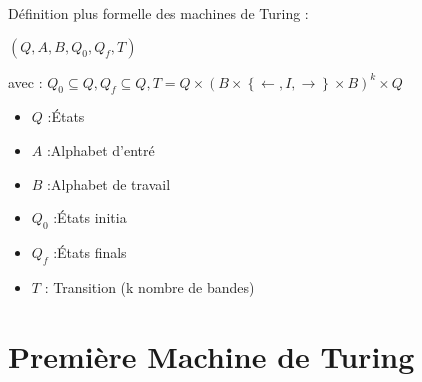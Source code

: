 \documentclass{article}
\theoremstyle{plain}
\theoremstyle{nonumberplain}
\begin{document}
  Définition plus formelle des machines de Turing :

  $(Q, A, B, Q_0, Q_f, T)$

  avec : $Q_0 \subseteq Q, Q_f \subseteq Q, T = Q \times (B \times \left\{\leftarrow, I, \rightarrow\right\} \times B)^k \times Q$

  \begin{itemize}
    \item $Q$ :\'Etats
    \item $A$ :Alphabet d'entré
    \item $B$ :Alphabet de travail
    \item $Q_0$ :\'Etats initia
    \item $Q_f$ :\'Etats finals
    \item $T$ : Transition (k nombre de bandes)
  \end{itemize}

\newpage
\section{Première Machine de Turing}
  
\end{document}
